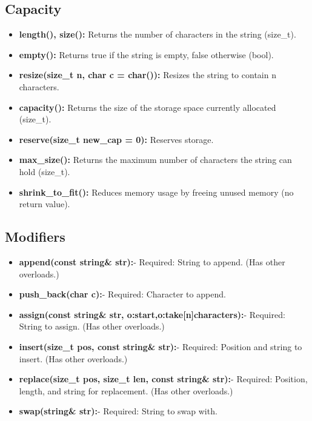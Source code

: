\documentclass{report}
\begin{document}
    \subsection{Capacity}
    \begin{itemize}
        \item \textbf{length(), \textbf{size():}} Returns the number of characters in the string (size\_t).
        \item \textbf{empty():} Returns true if the string is empty, false otherwise (bool).
        \item \textbf{resize(size\_t \textbf{n, char c = char()):}} Resizes the string to contain n characters.
        \item \textbf{capacity():} Returns the size of the storage space currently allocated (size\_t).
        \item \textbf{reserve(size\_t \textbf{new\_cap = 0):}} Reserves storage.
        \item \textbf{max\_size():} Returns the maximum number of characters the string can hold (size\_t).
        \item \textbf{shrink\_to\_fit():} Reduces memory usage by freeing unused memory (no return value).
    \end{itemize}
    \bigbreak \noindent 
    \subsection{Modifiers}
    \begin{itemize}
        \item \textbf{append(const \textbf{string\& str):}}- Required: String to append. (Has other overloads.)
        \item \textbf{push\_back(char c):}- Required: Character to append.
        \item \textbf{assign(const \textbf{string\& str, o:start,o:take[n]characters):}}- Required: String to assign. (Has other overloads.)
        \item \textbf{insert(size\_t \textbf{pos, const string\& str):}}- Required: Position and string to insert. (Has other overloads.)
        \item \textbf{replace(size\_t \textbf{pos, size\_t len, const string\& str):}}- Required: Position, length, and string for replacement. (Has other overloads.)
        \item \textbf{swap(string\& \textbf{str):}}- Required: String to swap with.
    \end{itemize}
\end{document}
